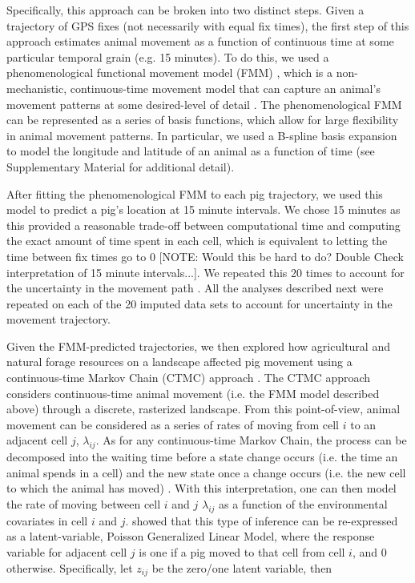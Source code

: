 \documentclass[a4paper]{article}
\begin{document}
Specifically, this approach can be broken into two distinct steps. Given a trajectory of GPS fixes (not necessarily with equal fix times), the first step of this approach estimates animal movement as a function of continuous time at some particular temporal grain (e.g. 15 minutes).  To do this, we used a phenomenological functional movement model (FMM) \citep{Buderman2016,Hooten2017a}, which is a non-mechanistic, continuous-time movement model that can capture an animal's movement patterns at some desired-level of detail \citep{Buderman2016}.  The phenomenological FMM can be represented as a series of basis functions, which allow for large flexibility in animal movement patterns.
In particular, we used a B-spline basis expansion to model the longitude and latitude of an animal as a function of time (see Supplementary Material for additional detail).

After fitting the phenomenological FMM to each pig trajectory, we used this model to predict a pig's location at 15 minute intervals. We chose 15 minutes as this provided a reasonable trade-off between computational time and computing the exact amount of time spent in each cell, which is equivalent to letting the time between fix times go to 0 [NOTE: Would this be hard to do? Double Check interpretation of 15 minute intervals...]. We repeated this 20 times to account for the uncertainty in the movement path \citep{Hanks2015,Buderman2018}.  All the analyses described next were repeated on each of the 20 imputed data sets to account for uncertainty in the movement trajectory.

Given the FMM-predicted trajectories, we then explored how agricultural and natural forage resources on a landscape affected pig movement using a continuous-time Markov Chain (CTMC) approach \cite{Hanks2015}. The CTMC approach considers continuous-time animal movement (i.e. the FMM model described above) through a discrete, rasterized landscape. From this point-of-view, animal movement can be considered as a series of rates of moving from cell $i$ to an adjacent cell $j$, $\lambda_{ij}$.  As for any continuous-time Markov Chain, the process can be decomposed into the waiting time before a state change occurs (i.e. the time an animal spends in a cell) and the new state once a change occurs (i.e. the new cell to which the animal has moved) \citep{Allen2003a}.  With this interpretation, one can then model the rate of moving between cell $i$ and $j$ $\lambda_{ij}$ as a function of the environmental covariates in cell $i$ and $j$.  \cite{Hanks2015} showed that this type of inference can be re-expressed as a latent-variable, Poisson Generalized Linear Model, where the response variable for adjacent cell $j$ is one if a pig moved to that cell from cell $i$, and 0 otherwise. Specifically, let $z_{ij}$ be the zero/one latent variable, then
\end{document}
